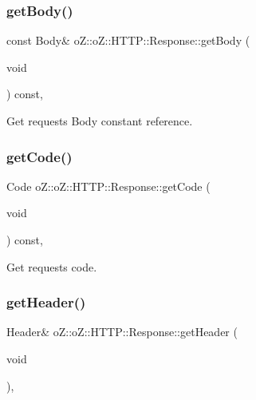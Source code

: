 \subsubsection{\texorpdfstring{getBody()}{getBody()}\hspace{0.1cm}{\footnotesize\ttfamily [2/2]}}
{\footnotesize\ttfamily const Body\& o\+Z\+::o\+Z\+::\+H\+T\+T\+P\+::\+Response\+::get\+Body (\begin{DoxyParamCaption}\item[{void}]{ }\end{DoxyParamCaption}) const\hspace{0.3cm}{\ttfamily [inline]}, {\ttfamily [noexcept]}}



Get request\textquotesingle{}s Body constant reference. 

\mbox{\label{classo_z_1_1o_z_1_1_h_t_t_p_1_1_response_aacfdfb400c4c7e8f46a6b7967b9e174f}} 
\subsubsection{\texorpdfstring{getCode()}{getCode()}}
{\footnotesize\ttfamily Code o\+Z\+::o\+Z\+::\+H\+T\+T\+P\+::\+Response\+::get\+Code (\begin{DoxyParamCaption}\item[{void}]{ }\end{DoxyParamCaption}) const\hspace{0.3cm}{\ttfamily [inline]}, {\ttfamily [noexcept]}}



Get request\textquotesingle{}s code. 

\mbox{\label{classo_z_1_1o_z_1_1_h_t_t_p_1_1_response_a38279a872d9c2c731fc43493995afabe}} 
\subsubsection{\texorpdfstring{getHeader()}{getHeader()}\hspace{0.1cm}{\footnotesize\ttfamily [1/2]}}
{\footnotesize\ttfamily Header\& o\+Z\+::o\+Z\+::\+H\+T\+T\+P\+::\+Response\+::get\+Header (\begin{DoxyParamCaption}\item[{void}]{ }\end{DoxyParamCaption})\hspace{0.3cm}{\ttfamily [inline]}, {\ttfamily [noexcept]}}



